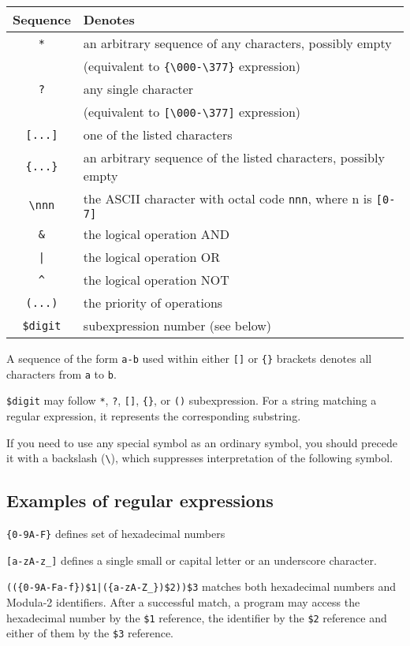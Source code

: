 \begin{center}
\begin{tabular}{cl}
\bf Sequence & \bf Denotes \\
\hline
\verb+*+      & an arbitrary sequence of any characters, possibly empty \\
              & (equivalent to \verb|{\000-\377}| expression) \\
\verb+?+      & any single character \\
              & (equivalent  to \verb|[\000-\377]| expression) \\
\verb+[...]+  & one of the listed characters \\
\verb+{...}+  & an arbitrary sequence of the listed characters, possibly empty \\
\verb+\nnn+   & the ASCII character with octal code \verb|nnn|, where n is \verb|[0-7]| \\
\verb+&+      & the logical operation AND \\
\verb+|+      & the logical operation OR  \\
\verb+^+      & the logical operation NOT \\
\verb+(...)+  & the priority of operations \\
\verb+$digit+ & subexpression number (see below)
\end{tabular}
\end{center}

A  sequence of the  form \verb|a-b|  used  within  either
\verb|[]| or \verb|{}| brackets denotes all characters from
\verb|a| to \verb|b|.

\verb'$digit' may follow \verb|*|, \verb|?|, \verb|[]|, \verb|{}|, or
\verb|()| subexpression. For a string matching a regular expression,
it represents the corresponding substring.

If you need to use any special symbol as an ordinary symbol, you should
precede it with a backslash (\verb|\|), which suppresses interpretation of
the following symbol.

\subsection{Examples of regular expressions}

\indent
\verb|{0-9A-F}| defines set of hexadecimal numbers

\verb|[a-zA-z_]| defines a single small or capital letter or an underscore
character.

\verb'(({0-9A-Fa-f})$1|({a-zA-Z_})$2))$3' matches
both hexadecimal numbers and Modula-2 identifiers. After a
successful match, a program may access the
hexadecimal number by the \verb|$1| reference,
the identifier by the \verb|$2|  reference  and
either of them by the \verb|$3| reference.

